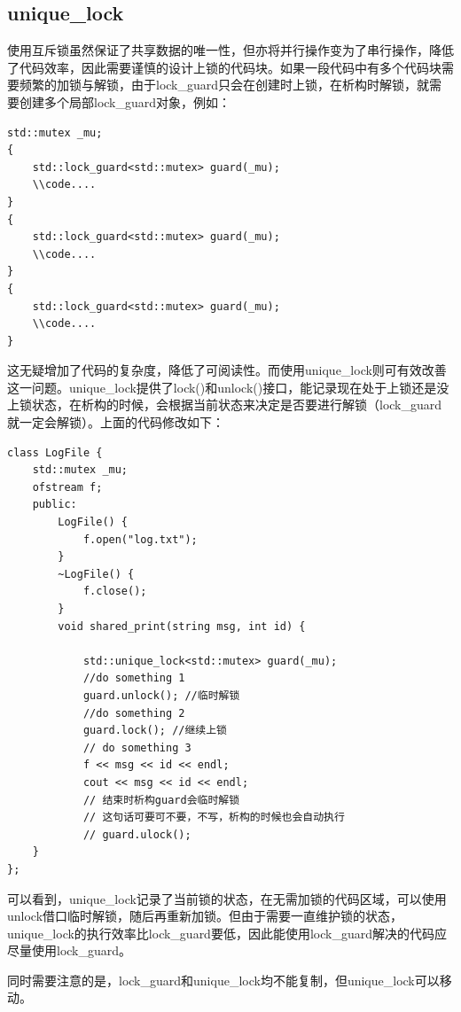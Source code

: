 \subsection{unique\_lock}
使用互斥锁虽然保证了共享数据的唯一性，但亦将并行操作变为了串行操作，降低了代码效率，因此需要谨慎的设计上锁的代码块。如果一段代码中有多个代码块需要频繁的加锁与解锁，由于lock\_guard只会在创建时上锁，在析构时解锁，就需要创建多个局部lock\_guard对象，例如：\\
\begin{lstlisting}
std::mutex _mu;
{
	std::lock_guard<std::mutex> guard(_mu);
	\\code....
}
{
	std::lock_guard<std::mutex> guard(_mu);
	\\code....	
}
{
	std::lock_guard<std::mutex> guard(_mu);
	\\code....
}
\end{lstlisting}
这无疑增加了代码的复杂度，降低了可阅读性。而使用unique\_lock则可有效改善这一问题。unique\_lock提供了lock()和unlock()接口，能记录现在处于上锁还是没上锁状态，在析构的时候，会根据当前状态来决定是否要进行解锁（lock\_guard就一定会解锁）。上面的代码修改如下：\\
\begin{lstlisting}
class LogFile {
	std::mutex _mu;
	ofstream f;
	public:
		LogFile() {
			f.open("log.txt");
		}
		~LogFile() {
			f.close();
		}
		void shared_print(string msg, int id) {
		
			std::unique_lock<std::mutex> guard(_mu);
			//do something 1
			guard.unlock(); //临时解锁
			//do something 2
			guard.lock(); //继续上锁
			// do something 3
			f << msg << id << endl;
			cout << msg << id << endl;
			// 结束时析构guard会临时解锁
			// 这句话可要可不要，不写，析构的时候也会自动执行
			// guard.ulock();
	}
};
\end{lstlisting}
可以看到，unique\_lock记录了当前锁的状态，在无需加锁的代码区域，可以使用unlock借口临时解锁，随后再重新加锁。但由于需要一直维护锁的状态，unique\_lock的执行效率比lock\_guard要低，因此能使用lock\_guard解决的代码应尽量使用lock\_guard。

同时需要注意的是，lock\_guard和unique\_lock均不能复制，但unique\_lock可以移动。
